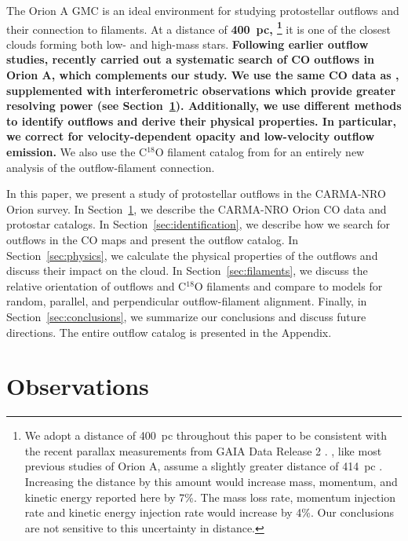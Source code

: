 \documentclass[twocolumn]{aastex63}
\begin{document}
The Orion A GMC is an ideal environment for studying protostellar outflows and their connection to filaments. At a distance of \textbf{400~pc, \footnote{We adopt a distance of 400~pc throughout this paper to be consistent with the recent parallax measurements from GAIA Data Release 2 \citep{Kounkel18,Grossschedl18,Kuhn19}.  \citet{Tanabe19}, like most previous studies of Orion A, assume a slightly greater distance of 414~pc \citep{Menten07}. Increasing the distance by this amount would increase mass, momentum, and kinetic energy reported here by 7\%. The mass loss rate, momentum injection rate and kinetic energy injection rate would increase by 4\%. Our conclusions are not sensitive to this uncertainty in distance.}} it is one of the closest clouds forming both low- and high-mass stars. \textbf{Following earlier outflow studies, \citet{Tanabe19} recently carried out a systematic search of CO outflows in Orion A, which complements our study. We use the same CO data as \citet{Tanabe19}, supplemented with interferometric observations which provide greater resolving power (see Section~\ref{sec:observations}). Additionally, we use different methods to identify outflows and derive their physical properties. In particular, we correct for velocity-dependent opacity and low-velocity outflow emission.} We also use the C$^{18}$O filament catalog from \citet{Suri19} for an entirely new analysis of the outflow-filament connection.

In this paper, we present a study of protostellar outflows in the CARMA-NRO Orion survey. In Section~\ref{sec:observations}, we describe the CARMA-NRO Orion CO data and protostar catalogs. In Section~\ref{sec:identification}, we describe how we search for outflows in the CO maps and present the outflow catalog. In Section~\ref{sec:physics}, we calculate the physical properties of the outflows and discuss their impact on the cloud. In Section~\ref{sec:filaments}, we discuss the relative orientation of outflows and C$^{18}$O filaments and compare to models for random, parallel, and perpendicular outflow-filament alignment. Finally, in Section~\ref{sec:conclusions}, we summarize our conclusions and discuss future directions. The entire outflow catalog is presented in the Appendix.


\section{Observations}\label{sec:observations}
\end{document}
